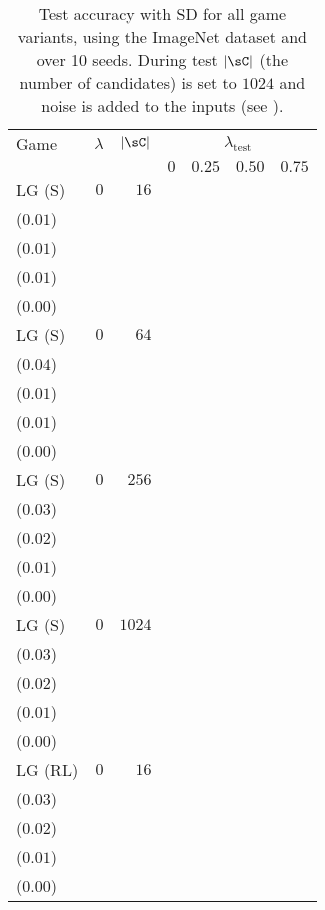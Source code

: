 \begin{table}[t]
\centering
\caption{Test accuracy with SD for all game variants, using the ImageNet dataset and over 10 seeds. During test \(|\sC|\) (the number of candidates) is set to \(1024\) and noise is added to the inputs (see ).}
\label{table:testinput_lg_imagenet_reward_1024}
\begin{tabular}{lrrrrrr}
\toprule
Game & \(\lambda\) & \(|\sC|\) & \multicolumn{4}{c}{\(\lambda_\text{test}\)} \\[1ex]
 &  &  & \multicolumn{1}{c}{\(0\)} & \multicolumn{1}{c}{\(0.25\)} & \multicolumn{1}{c}{\(0.50\)} & \multicolumn{1}{c}{\(0.75\)} \\
\midrule
LG {\scriptsize(S)} & \(0\) & \(16\) & \longcell{\(0.22\)\\{\tiny(\(0.01\))}} & \longcell{\(0.08\)\\{\tiny(\(0.01\))}} & \longcell{\(0.02\)\\{\tiny(\(0.01\))}} & \longcell{\(0.00\)\\{\tiny(\(0.00\))}} \\[2.2ex]
LG {\scriptsize(S)} & \(0\) & \(64\) & \longcell{\(0.30\)\\{\tiny(\(0.04\))}} & \longcell{\(0.10\)\\{\tiny(\(0.01\))}} & \longcell{\(0.02\)\\{\tiny(\(0.01\))}} & \longcell{\(0.00\)\\{\tiny(\(0.00\))}} \\[2.2ex]
LG {\scriptsize(S)} & \(0\) & \(256\) & \longcell{\(0.35\)\\{\tiny(\(0.03\))}} & \longcell{\(0.12\)\\{\tiny(\(0.02\))}} & \longcell{\(0.03\)\\{\tiny(\(0.01\))}} & \longcell{\(0.01\)\\{\tiny(\(0.00\))}} \\[2.2ex]
LG {\scriptsize(S)} & \(0\) & \(1024\) & \longcell{\(0.41\)\\{\tiny(\(0.03\))}} & \longcell{\(0.13\)\\{\tiny(\(0.02\))}} & \longcell{\(0.03\)\\{\tiny(\(0.01\))}} & \longcell{\(0.00\)\\{\tiny(\(0.00\))}} \\[2.2ex]
LG {\scriptsize(RL)} & \(0\) & \(16\) & \longcell{\(0.28\)\\{\tiny(\(0.03\))}} & \longcell{\(0.10\)\\{\tiny(\(0.02\))}} & \longcell{\(0.02\)\\{\tiny(\(0.01\))}} & \longcell{\(0.00\)\\{\tiny(\(0.00\))}} \\[2.2ex]

\end{tabular}
\end{table}
